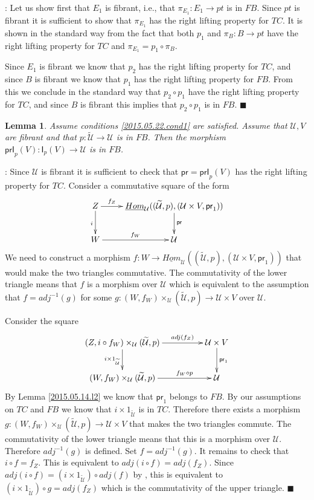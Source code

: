 \documentclass[12pt]{article}
\numberwithin{equation}{section}
\newenvironment{myproof}{{\bf Proof}:}{$\blacksquare$ \vskip 5mm }
\newtheorem{lemma}[proposition]{Lemma}
\newcommand{\sr}{\rightarrow}
\newcommand{\uu}{\underline}
\newcommand{\iHom}{\uu{Hom}}
\newcommand{\wt}{\widetilde}
\newcommand{\dd}{\diamond}
\newcommand{\id}{1}            %
\newcommand{\U}{\mathcal{U}}
\newcommand{\I}{\mathsf{I}}
\newcommand{\pr}{\mathsf{pr}}
\newcommand{\prI}{\mathsf{prI}}
\begin{document}
%
\begin{myproof}
Let us show first that $E_1$ is fibrant, i.e., that $\pi_{E_1}:E_1\sr pt$ is in
$FB$. Since $pt$ is fibrant it is sufficient to show that $\pi_{E_1}$ has the
right lifting property for $TC$. It is shown in the standard way from the fact
that both $p_1$ and $\pi_B:B\sr pt$ have the right lifting property for $TC$
and $\pi_{E_1}=p_1\circ \pi_B$.

Since $E_1$ is fibrant we know that $p_2$ has the right lifting property for
$TC$, and since $B$ is fibrant we know that $p_1$ has the right lifting property
for $FB$. From this we conclude in the standard way that $p_2\circ p_1$ have
the right lifting property for $TC$, and since $B$ is fibrant this implies that
$p_2\circ p_1$ is in $FB$.
\end{myproof}
%
\begin{lemma}
  \label{2015.05.14.l1}
  Assume conditions \ref{2015.05.22.cond1} are satisfied.
  Assume that $\U,V$ are fibrant and that $p:\wt{\U}\sr \U$
  is in $FB$. Then the morphism $\prI_p(V):\I_p(V)\sr \U$ is in $FB$.
\end{lemma}
%
\begin{myproof}
Since $\U$ is fibrant it is sufficient to check that $\pr=\prI_p(V)$ has the right
lifting property for $TC$. Consider a commutative square of the form
%
$$
\begin{xy}
          \xymatrix@C=2pc{ Z \ar[r]^-{f_Z} \ar[d]_{i} &
            \iHom_\U((\wt{\U},p),(\U\times V,\pr_1)) \ar[d]^{\pr}\\ W
            \ar[r]^-{f_W} & \U }
\end{xy}
$$
%
We need to construct a morphism $f:W\sr \iHom_\U((\wt{\U},p),(\U\times
V,\pr_1))$ that would make the two triangles commutative. The commutativity of
the lower triangle means that $f$ is a morphism over $\U$ which is equivalent to
the assumption that $f=adj^{-1}(g)$ for some $g:(W,f_W)\times_\U (\wt{\U},p)\sr
\U\times V$ over $\U$.

Consider the square
%
$$
\begin{xy}
          \xymatrix@C=4pc{ (Z, i\circ f_W)\times_\U (\wt{\U},p)
            \ar[r]^-{adj(f_Z)} \ar[d]_{i\times \id_{\wt{\U}}} & \U\times V
            \ar[d]^{\pr_1}\\ (W,f_W)\times_\U (\wt{\U},p) \ar[r]^-{f_W\dd p} & \U }
\end{xy}
$$
%
By Lemma \ref{2015.05.14.l2} we know that $\pr_1$ belongs to $FB$. By our
assumptions on $TC$ and $FB$ we know that $i\times \id_{\wt{\U}}$ is in
$TC$. Therefore there exists a morphism $g:(W,f_W)\times_\U (\wt{\U},p) \sr
\U\times V$ that makes the two triangles commute.  The commutativity of the
lower triangle means that this is a morphism over $\U$. Therefore $adj^{-1}(g)$
is defined. Set $f=adj^{-1}(g)$. It remains to check that $i\circ f=f_Z$. This
is equivalent to $adj(i\circ f)=adj(f_Z)$. Since $adj(i\circ f)=(i\times
\id_{\wt{\U}})\circ adj(f)$ by \cite[Lemma 8.7(3)]{fromunivwithPi}, this is
equivalent to $(i\times \id_{\wt{\U}})\circ g=adj(f_Z)$ which is the
commutativity of the upper triangle.
\end{myproof}
\end{document}
